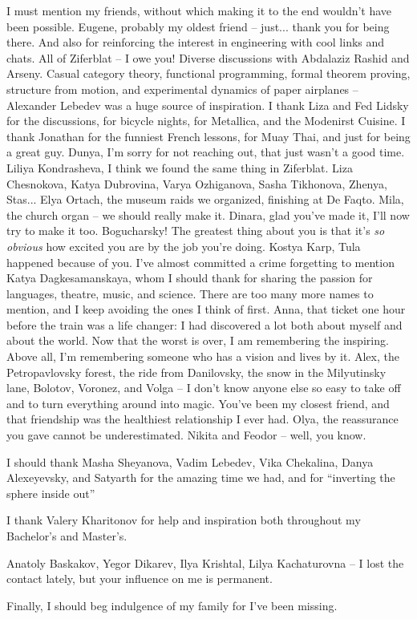 I must mention my friends, without which making it to the end wouldn't have
been possible. Eugene, probably my oldest friend -- just... thank you for being
there. And also for reinforcing the interest in engineering with cool links and chats.
All of Ziferblat -- I owe you! Diverse discussions with Abdalaziz Rashid
and Arseny. Casual category theory, functional programming, formal
theorem proving, structure from motion, and experimental dynamics of paper
airplanes -- Alexander Lebedev was a huge source of inspiration. I thank Liza
and Fed Lidsky for the discussions, for bicycle nights, for Metallica, and the
Modenirst Cuisine. I thank Jonathan for the funniest French lessons, for Muay
Thai, and just for being a great guy. Dunya, I'm sorry for not reaching out,
that just wasn't a good time. Liliya Kondrasheva, I think we found the same thing
in Ziferblat. Liza Chesnokova, Katya Dubrovina, Varya Ozhiganova, Sasha
Tikhonova, Zhenya, Stas... Elya Ortach, the museum raids we organized, finishing
at De Faqto. Mila, the church organ -- we should really make it. Dinara, glad
you've made it, I'll now try to make it too. Bogucharsky! The greatest thing
about you is that it's \emph{so obvious} how excited you are by the job you're doing.
Kostya Karp, Tula happened because of you. I've almost committed a crime
forgetting to mention Katya Dagkesamanskaya, whom I should thank for sharing
the passion for languages, theatre, music, and science.
There are too many more names to
mention, and I keep avoiding the ones I think of first. Anna, that ticket one
hour before the train was a life changer: I had discovered a lot both about
myself and about the world. Now that the worst is over, I am remembering the
inspiring. Above all, I'm remembering someone who has a vision and lives by it.
Alex, the Petropavlovsky forest, the ride from Danilovsky, the snow in the
Milyutinsky lane, Bolotov, Voronez, and Volga -- I don't know anyone else so
easy to take off and to turn everything around into magic. You've been my
closest friend, and that friendship was the healthiest relationship I ever had.
Olya, the reassurance you gave cannot be underestimated.
Nikita and Feodor -- well, you know.

I should thank Masha Sheyanova, Vadim Lebedev, Vika Chekalina, Danya
Alexeyevsky, and Satyarth for the amazing time we had, and for ``inverting the
sphere inside out''

I thank Valery Kharitonov for help and inspiration both throughout my
Bachelor's and Master's.

Anatoly Baskakov, Yegor Dikarev, Ilya Krishtal, Lilya Kachaturovna -- I lost
the contact lately, but your influence on me is permanent.

Finally, I should beg indulgence of my family for I've been missing.
